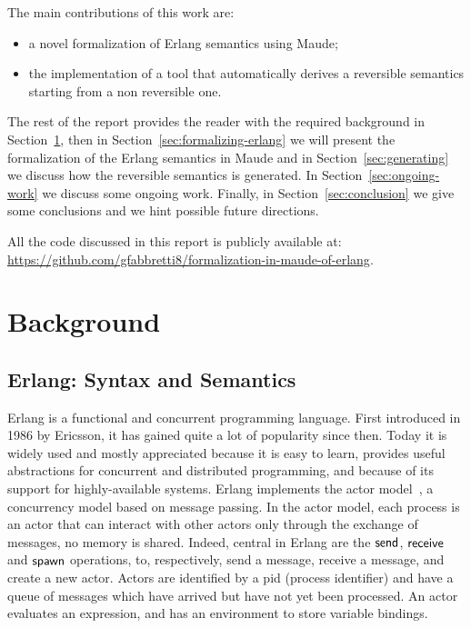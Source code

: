 \documentclass{article}[12pt,a4paper]
\theoremstyle{definition}
\begin{document}
The main contributions of this work are:
\begin{itemize}
  \item a novel formalization of Erlang semantics using
    Maude;
  \item the implementation of a tool that automatically derives a reversible
    semantics starting from a non reversible one.
\end{itemize}

The rest of the report provides the reader with the required
background in Section~\ref{sec:background}, then in
Section~\ref{sec:formalizing-erlang} we will present the formalization of
the Erlang semantics in Maude and in Section~\ref{sec:generating} we discuss how the reversible semantics
is generated. In Section~\ref{sec:ongoing-work} we discuss some
ongoing work. Finally, in Section~\ref{sec:conclusion} we give some
conclusions and we hint possible future directions.

All the code discussed in this report is publicly available at: \url{https://github.com/gfabbretti8/formalization-in-maude-of-erlang}.

\section{Background}\label{sec:background}

\subsection{Erlang: Syntax and Semantics}

Erlang is a functional and concurrent programming language. First
introduced in 1986 by Ericsson, it has gained quite a lot of
popularity since then.  Today it is widely used and mostly appreciated
because it is easy to learn, provides useful abstractions for
concurrent and distributed programming, and because of its support for
highly-available systems. Erlang implements the actor model~\cite{}, a
concurrency model based on message passing. In the actor model, each
process is an actor that can interact with other actors
only through the exchange of messages, no memory is shared. Indeed,
central in Erlang are the $\mathsf{send}$, $\mathsf{receive}$ and $\mathsf{spawn}$
operations, to, respectively, send a message, receive a message, and
create a new actor. Actors are identified by a pid (process identifier) and have a queue of messages which have arrived but have not yet been processed.
An actor evaluates an expression, and has an environment to store variable bindings.
\end{document}
